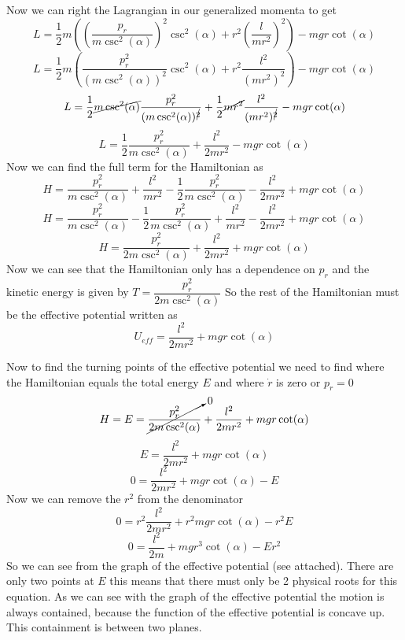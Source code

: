 \documentclass[11pt]{article}
\numberwithin{equation}{section}
\begin{document}
Now we can right the Lagrangian in our generalized momenta to get
$$L = \frac{1}{2}m\left(\left(\frac{p_r}{m\csc^2(\alpha)}\right)^2\csc^2(\alpha)  + r^2\left(\frac{l}{mr^2}\right)^2\right) - mgr\cot(\alpha)$$
$$L = \frac{1}{2}m\left(\frac{p_r^2}{(m\csc^2(\alpha))^2}\csc^2(\alpha)  + r^2\frac{l^2}{(mr^2)^2}\right) - mgr\cot(\alpha)$$
$$L = \frac{1}{2}\cancel{m\csc^2(\alpha)}\frac{p_r^2}{(m\csc^2(\alpha))^{\cancel{2}}}  + \frac{1}{2}\cancel{mr^2}\frac{l^2}{(mr^2)^{\cancel{2}}} - mgr\cot(\alpha)$$
$$L = \frac{1}{2} \frac{p_r^2}{m\csc^2(\alpha)} + \frac{l^2}{2mr^2} - mgr\cot(\alpha)$$
Now we can find the full term for the Hamiltonian as 
$$H = \frac{p_r^2}{m\csc^2(\alpha)}+ \frac{l^2}{mr^2} - \frac{1}{2} \frac{p_r^2}{m\csc^2(\alpha)} - \frac{l^2}{2mr^2} + mgr\cot(\alpha)$$
$$H = \frac{p_r^2}{m\csc^2(\alpha)} - \frac{1}{2} \frac{p_r^2}{m\csc^2(\alpha)}+ \frac{l^2}{mr^2} - \frac{l^2}{2mr^2} + mgr\cot(\alpha)$$
$$H = \frac{p_r^2}{2m\csc^2(\alpha)} + \frac{l^2}{2mr^2} + mgr\cot(\alpha)$$
Now we can see that the Hamiltonian only has a dependence on $p_r$ and the kinetic energy is given by $T = \dfrac{p_r^2}{2m\csc^2(\alpha)}$ So the rest of the Hamiltonian must be the effective potential written as
$$U_{eff} = \frac{l^2}{2mr^2}+ mgr\cot(\alpha)$$

Now to find the turning points of the effective potential we need to find where the Hamiltonian equals the total energy $E$ and where $\dot{r}$ is zero or $p_r = 0$ 
$$H = E = \cancelto{0}{\frac{p_r^2}{2m\csc^2(\alpha)}} + \frac{l^2}{2mr^2} + mgr\cot(\alpha)$$
$$E =  \frac{l^2}{2mr^2} + mgr\cot(\alpha)$$
$$0 =  \frac{l^2}{2mr^2} + mgr\cot(\alpha) - E$$
Now we can remove the $r^2$ from the denominator
$$0 =  r^2\frac{l^2}{2mr^2} + r^2mgr\cot(\alpha) - r^2E$$
$$0 =  \frac{l^2}{2m} + mgr^3\cot(\alpha) - Er^2$$
So we can see from the graph of the effective potential (see attached). There are only two points at $E$ this means that there must only be 2 physical roots for this equation.
As we can see with the graph of the effective potential the motion is always contained, because the function of the effective potential is concave up. This containment is between two planes.
\end{document}
